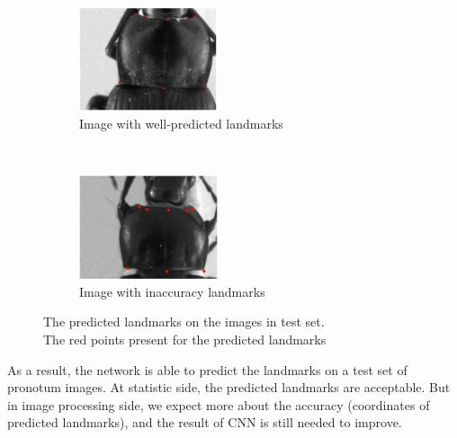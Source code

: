 \documentclass[10pt]{article}
\begin{document}
\begin{figure}[htbp]
    \centering
    \begin{subfigure}[t]{0.25\textwidth}
        \centering
        \includegraphics[height=1.2in]{images/plandmark}
        \caption{Image with well-predicted landmarks}
        \label{figsub1}
    \end{subfigure}%
    ~ 
    \begin{subfigure}[t]{0.25\textwidth}
        \centering
        \includegraphics[height=1.2in]{images/plandmark2}
        \caption{Image with inaccuracy landmarks}
        \label{figsub2}
    \end{subfigure}
    \caption{The predicted landmarks on the images in test set.\\
    		 The red points present for the predicted landmarks}
    \label{figrsexample}
\end{figure}



As a result, the network is able to predict the landmarks on a test set of pronotum images. At statistic side, the predicted landmarks are acceptable. But in image processing side, we expect more about the accuracy (coordinates of predicted landmarks), and the result of CNN is still needed to improve. 
\end{document}
